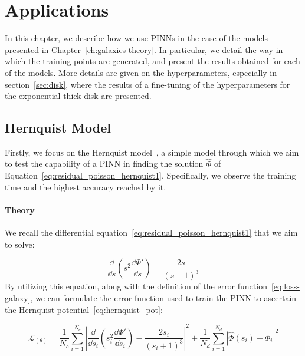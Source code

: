 \chapter{Applications}\label{ch:applications}

In this chapter, we describe how we use PINNs in the case of the models presented in Chapter~\ref{ch:galaxies-theory}. In particular, we detail the way in which the training points are generated, and present the results obtained for each of the models. More details are given on the hyperparameters, especially in section~\ref{sec:disk}, where the results of a fine-tuning of the hyperparameters for the exponential thick disk are presented.

\section{Hernquist Model}\label{sec:hernquist}

Firstly, we focus on the Hernquist model~\cite{hernquist_analytical_1990}, a simple model through which we aim to test the capability of a PINN in finding the solution $\hat{\Phi}$ of Equation~\eqref{eq:residual_poisson_hernquist1}. Specifically, we observe the training time and the highest accuracy reached by it.

\subsubsection{Theory}

We recall the differential equation~\eqref{eq:residual_poisson_hernquist1} that we aim to solve:

\begin{equation}
    \dfrac{\dd}{\dd s}\left(s^2 \dfrac{\dd \Phi'}{\dd s}\right) = \dfrac{2s}{(s+1)^3}
\end{equation} By utilizing this equation, along with the definition of the error function~\eqref{eq:loss-galaxy}, we can formulate the error function used to train the PINN to ascertain the Hernquist potential~\eqref{eq:hernquist_pot}:

\begin{equation}
    \mathcal{L}_(\theta) = \dfrac{1}{N_c}\sum^{N_c}_{i=1} \left|\dfrac{\dd}{\dd s_i}\left(s_{i}^{2} \dfrac{\dd \Phi'}{\dd s_i}\right) - \dfrac{2s_i}{(s_i+1)^3} \right|^2 + \dfrac{1}{N_d}\sum^{N_d}_{i=1} \left|\hat{\Phi}(s_i) - \Phi_i \right|^2
\end{equation}


